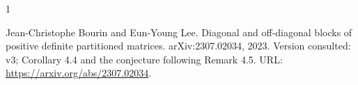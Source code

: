 \documentclass[10pt,a4paper]{article}
\theoremstyle{remark}
\begin{document}
\begin{thebibliography}{1}

Jean-Christophe Bourin and Eun-Young Lee.
\newblock Diagonal and off-diagonal blocks of positive definite partitioned
  matrices.
\newblock arXiv:2307.02034, 2023.
\newblock Version consulted: v3; Corollary 4.4 and the conjecture following
  Remark 4.5.
\newblock URL: \url{https://arxiv.org/abs/2307.02034}.

\end{thebibliography}
\end{document}
